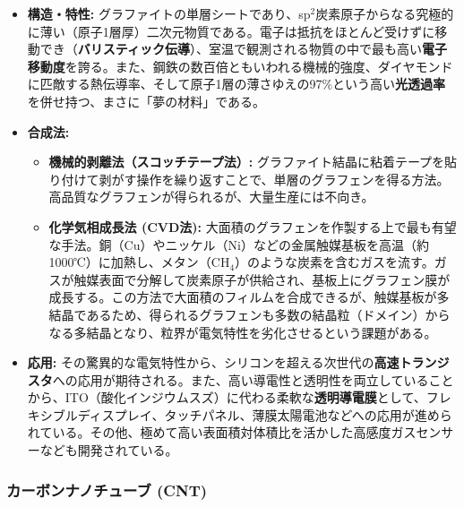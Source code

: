 \documentclass[11pt,a4paper]{ltjsarticle}
\begin{document}
\begin{itemize}
\item \textbf{構造・特性:} グラファイトの単層シートであり、sp$^2$炭素原子からなる究極的に薄い（原子1層厚）二次元物質である。電子は抵抗をほとんど受けずに移動でき（\textbf{バリスティック伝導}）、室温で観測される物質の中で最も高い\textbf{電子移動度}を誇る。また、鋼鉄の数百倍ともいわれる機械的強度、ダイヤモンドに匹敵する熱伝導率、そして原子1層の薄さゆえの97\%という高い\textbf{光透過率}を併せ持つ、まさに「夢の材料」である。
\item \textbf{合成法:}
\begin{itemize}
\item \textbf{機械的剥離法（スコッチテープ法）:} グラファイト結晶に粘着テープを貼り付けて剥がす操作を繰り返すことで、単層のグラフェンを得る方法。高品質なグラフェンが得られるが、大量生産には不向き。
\item \textbf{化学気相成長法 (CVD法):} 大面積のグラフェンを作製する上で最も有望な手法。銅（Cu）やニッケル（Ni）などの金属触媒基板を高温（約1000℃）に加熱し、メタン（CH$_4$）のような炭素を含むガスを流す。ガスが触媒表面で分解して炭素原子が供給され、基板上にグラフェン膜が成長する。この方法で大面積のフィルムを合成できるが、触媒基板が多結晶であるため、得られるグラフェンも多数の結晶粒（ドメイン）からなる多結晶となり、粒界が電気特性を劣化させるという課題がある。
\end{itemize}
\item \textbf{応用:} その驚異的な電気特性から、シリコンを超える次世代の\textbf{高速トランジスタ}への応用が期待される。また、高い導電性と透明性を両立していることから、ITO（酸化インジウムスズ）に代わる柔軟な\textbf{透明導電膜}として、フレキシブルディスプレイ、タッチパネル、薄膜太陽電池などへの応用が進められている。その他、極めて高い表面積対体積比を活かした高感度ガスセンサーなども開発されている。
\end{itemize}

\subsubsection*{カーボンナノチューブ (CNT)}
\end{document}
